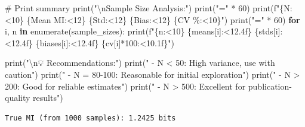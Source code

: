 \documentclass[
  11pt,
  letterpaper,
  oneside,
  openany]{book}
\newenvironment{Shaded}{\begin{snugshade}}{\end{snugshade}}
\newcommand{\BuiltInTok}[1]{\textcolor[rgb]{0.00,0.23,0.31}{#1}}
\newcommand{\CharTok}[1]{\textcolor[rgb]{0.13,0.47,0.30}{#1}}
\newcommand{\CommentTok}[1]{\textcolor[rgb]{0.37,0.37,0.37}{#1}}
\newcommand{\ControlFlowTok}[1]{\textcolor[rgb]{0.00,0.23,0.31}{\textbf{#1}}}
\newcommand{\DecValTok}[1]{\textcolor[rgb]{0.68,0.00,0.00}{#1}}
\newcommand{\KeywordTok}[1]{\textcolor[rgb]{0.00,0.23,0.31}{\textbf{#1}}}
\newcommand{\NormalTok}[1]{\textcolor[rgb]{0.00,0.23,0.31}{#1}}
\newcommand{\OperatorTok}[1]{\textcolor[rgb]{0.37,0.37,0.37}{#1}}
\newcommand{\SpecialCharTok}[1]{\textcolor[rgb]{0.37,0.37,0.37}{#1}}
\newcommand{\SpecialStringTok}[1]{\textcolor[rgb]{0.13,0.47,0.30}{#1}}
\newcommand{\StringTok}[1]{\textcolor[rgb]{0.13,0.47,0.30}{#1}}
\begin{document}
\begin{Shaded}
\begin{Highlighting}[]
\CommentTok{\# Print summary}
\BuiltInTok{print}\NormalTok{(}\StringTok{"}\CharTok{\textbackslash{}n}\StringTok{Sample Size Analysis:"}\NormalTok{)}
\BuiltInTok{print}\NormalTok{(}\StringTok{"="} \OperatorTok{*} \DecValTok{60}\NormalTok{)}
\BuiltInTok{print}\NormalTok{(}\SpecialStringTok{f"}\SpecialCharTok{\{}\StringTok{\textquotesingle{}N\textquotesingle{}}\SpecialCharTok{:\textless{}10\}}\SpecialStringTok{ }\SpecialCharTok{\{}\StringTok{\textquotesingle{}Mean MI\textquotesingle{}}\SpecialCharTok{:\textless{}12\}}\SpecialStringTok{ }\SpecialCharTok{\{}\StringTok{\textquotesingle{}Std\textquotesingle{}}\SpecialCharTok{:\textless{}12\}}\SpecialStringTok{ }\SpecialCharTok{\{}\StringTok{\textquotesingle{}Bias\textquotesingle{}}\SpecialCharTok{:\textless{}12\}}\SpecialStringTok{ }\SpecialCharTok{\{}\StringTok{\textquotesingle{}CV \%\textquotesingle{}}\SpecialCharTok{:\textless{}10\}}\SpecialStringTok{"}\NormalTok{)}
\BuiltInTok{print}\NormalTok{(}\StringTok{"="} \OperatorTok{*} \DecValTok{60}\NormalTok{)}
\ControlFlowTok{for}\NormalTok{ i, n }\KeywordTok{in} \BuiltInTok{enumerate}\NormalTok{(sample\_sizes):}
    \BuiltInTok{print}\NormalTok{(}\SpecialStringTok{f"}\SpecialCharTok{\{}\NormalTok{n}\SpecialCharTok{:\textless{}10\}}\SpecialStringTok{ }\SpecialCharTok{\{}\NormalTok{means[i]}\SpecialCharTok{:\textless{}12.4f\}}\SpecialStringTok{ }\SpecialCharTok{\{}\NormalTok{stds[i]}\SpecialCharTok{:\textless{}12.4f\}}\SpecialStringTok{ }\SpecialCharTok{\{}\NormalTok{biases[i]}\SpecialCharTok{:\textless{}12.4f\}}\SpecialStringTok{ }\SpecialCharTok{\{}\NormalTok{cv[i]}\OperatorTok{*}\DecValTok{100}\SpecialCharTok{:\textless{}10.1f\}}\SpecialStringTok{"}\NormalTok{)}

\BuiltInTok{print}\NormalTok{(}\StringTok{"}\CharTok{\textbackslash{}n}\StringTok{💡 Recommendations:"}\NormalTok{)}
\BuiltInTok{print}\NormalTok{(}\StringTok{"  {-} N \textless{} 50: High variance, use with caution"}\NormalTok{)}
\BuiltInTok{print}\NormalTok{(}\StringTok{"  {-} N = 80{-}100: Reasonable for initial exploration"}\NormalTok{)}
\BuiltInTok{print}\NormalTok{(}\StringTok{"  {-} N \textgreater{} 200: Good for reliable estimates"}\NormalTok{)}
\BuiltInTok{print}\NormalTok{(}\StringTok{"  {-} N \textgreater{} 500: Excellent for publication{-}quality results"}\NormalTok{)}
\end{Highlighting}
\end{Shaded}

\begin{verbatim}
True MI (from 1000 samples): 1.2425 bits
\end{verbatim}
\end{document}
